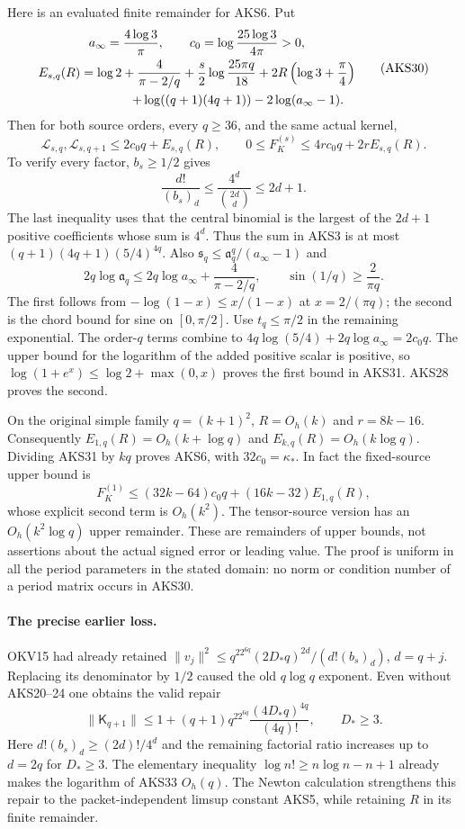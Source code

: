 \documentclass[11pt,a4paper]{article}
\begin{document}
Here is an evaluated finite remainder for AKS6. Put
\[
\begin{gathered}
 a_\infty=\frac{4\log3}{\pi},\qquad
 c_0=\log\frac{25\log3}{4\pi}>0,\\
 E_{s,q}(R)=\log2+\frac4{\pi-2/q}
  +\frac{s}{2}\log\frac{25\pi q}{18}
  +2R\left(\log3+\frac\pi4\right)\\
 \hspace{23mm}+\log((q+1)(4q+1))-2\log(a_\infty-1).
\end{gathered}\tag{AKS30}
\]
Then for both source orders, every $q\ge36$, and the same actual kernel,
\[
 \boxed{\quad
 \mathcal L_{s,q},\mathcal L_{s,q+1}\le2c_0q+E_{s,q}(R),\qquad
 0\le F_K^{(s)}\le4rc_0q+2rE_{s,q}(R).
 \quad}\tag{AKS31}
\]
To verify every factor, $b_s\ge1/2$ gives
\[
 \frac{d!}{(b_s)_d}\le\frac{4^d}{\binom{2d}{d}}\le2d+1.
\]
The last inequality uses that the central binomial is the largest of the
$2d+1$ positive coefficients whose sum is $4^d$. Thus the sum in AKS3
is at most $(q+1)(4q+1)(5/4)^{4q}$. Also
$\mathfrak s_q\le \mathfrak a_q^q/(a_\infty-1)$ and
\[
 2q\log \mathfrak a_q\le2q\log a_\infty+\frac4{\pi-2/q},\qquad
 \sin(1/q)\ge\frac2{\pi q}.
\]
The first follows from $-\log(1-x)\le x/(1-x)$ at $x=2/(\pi q)$;
the second is the chord bound for sine on $[0,\pi/2]$.
Use $t_q\le\pi/2$ in the remaining exponential. The order-$q$ terms
combine to
$4q\log(5/4)+2q\log a_\infty=2c_0q$.
The upper bound for the logarithm of the added positive scalar is
positive, so $\log(1+e^x)\le\log2+\max(0,x)$ proves the first bound in
AKS31. AKS28 proves the second.

On the original simple family $q=(k+1)^2$, $R=O_h(k)$ and
$r=8k-16$. Consequently $E_{1,q}(R)=O_h(k+\log q)$ and
$E_{k,q}(R)=O_h(k\log q)$. Dividing AKS31 by $kq$ proves AKS6, with
$32c_0=\kappa_*$. In fact the fixed-source upper bound is
\[
 F_K^{(1)}\le(32k-64)c_0q+(16k-32)E_{1,q}(R),
 \tag{AKS32}
\]
whose explicit second term is $O_h(k^2)$. The tensor-source version has
an $O_h(k^2\log q)$ upper remainder. These are remainders of upper
bounds, not assertions about the actual signed error or leading value.
The proof is uniform in all the period parameters in the stated domain:
no norm or condition number of a period matrix occurs in AKS30.

\paragraph{The precise earlier loss.}
OKV15 had already retained
$\|v_j\|^2\le q^22^{6q}(2D_*q)^{2d}/(d!(b_s)_d)$, $d=q+j$.
Replacing its denominator by $1/2$ caused the old $q\log q$ exponent.
Even without AKS20--24 one obtains the valid repair
\[
 \|\mathsf K_{q+1}\|\le
 1+(q+1)q^22^{6q}\frac{(4D_*q)^{4q}}{(4q)!},\qquad D_*\ge3.
 \tag{AKS33}
\]
Here $d!(b_s)_d\ge(2d)!/4^d$ and the remaining factorial ratio increases
up to $d=2q$ for $D_*\ge3$. The elementary inequality
$\log n!\ge n\log n-n+1$ already makes the logarithm of AKS33 $O_h(q)$.
The Newton calculation strengthens this repair to the packet-independent
limsup constant AKS5, while retaining $R$ in its finite remainder.
\end{document}
